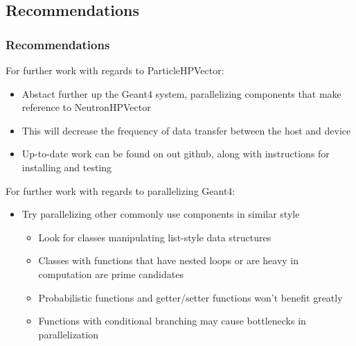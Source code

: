 \documentclass{beamer}
\begin{document}
\subsection{Recommendations}
\begin{frame}
\frametitle{Recommendations}
For further work with regards to ParticleHPVector:
\begin{itemize}
\item Abstact further up the Geant4 system, parallelizing 
components that make reference to NeutronHPVector
\item This will decrease the frequency of data transfer 
between the host and device
\item Up-to-date work can be found on out github, along 
with instructions for installing and testing
\end{itemize}
For further work with regards to parallelizing Geant4:
\begin{itemize}
\item Try parallelizing other commonly use components in similar style
\begin{itemize}
\item Look for classes manipulating list-style data structures
\item Classes with functions that have nested loops or are heavy in computation are prime candidates
\item Probabilistic functions and getter/setter functions won't benefit greatly
\item Functions with conditional branching may cause bottlenecks in parallelization
\end{itemize}
\end{itemize}
\end{frame}
\end{document}
